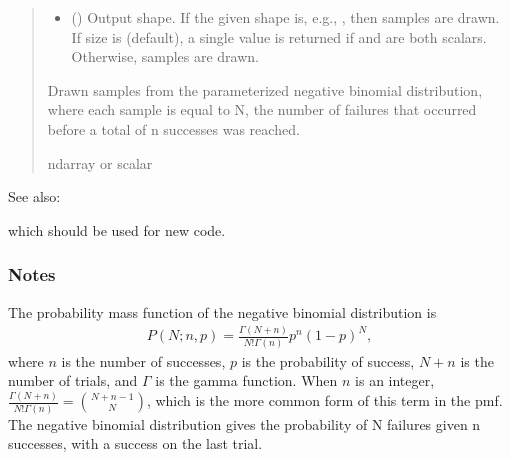 \documentclass[letterpaper,10pt,english]{sphinxmanual}
\begin{document}
\begin{fulllineitems}
\begin{quote}
\begin{description}
\begin{itemize}
\item {} 
\sphinxAtStartPar
{} (\sphinxstyleliteralemphasis{\sphinxupquote{, }}) \textendash{} Output shape.  If the given shape is, e.g., , then
 samples are drawn.  If size is  (default),
a single value is returned if  and  are both scalars.
Otherwise,  samples are drawn.

\end{itemize}

\sphinxAtStartPar
{} \textendash{} Drawn samples from the parameterized negative binomial distribution,
where each sample is equal to N, the number of failures that
occurred before a total of n successes was reached.

\sphinxAtStartPar
ndarray or scalar

\end{description}\end{quote}


\begin{sphinxseealso}{See also:}
\begin{description}
\sphinxAtStartPar
which should be used for new code.

\end{description}


\end{sphinxseealso}

\subsubsection*{Notes}

\sphinxAtStartPar
The probability mass function of the negative binomial distribution is
\begin{equation*}
\begin{split}P(N;n,p) = \frac{\Gamma(N+n)}{N!\Gamma(n)}p^{n}(1-p)^{N},\end{split}
\end{equation*}
\sphinxAtStartPar
where \(n\) is the number of successes, \(p\) is the
probability of success, \(N+n\) is the number of trials, and
\(\Gamma\) is the gamma function. When \(n\) is an integer,
\(\frac{\Gamma(N+n)}{N!\Gamma(n)} = \binom{N+n-1}{N}\), which is
the more common form of this term in the pmf. The negative
binomial distribution gives the probability of N failures given n
successes, with a success on the last trial.


\end{fulllineitems}
\end{document}
